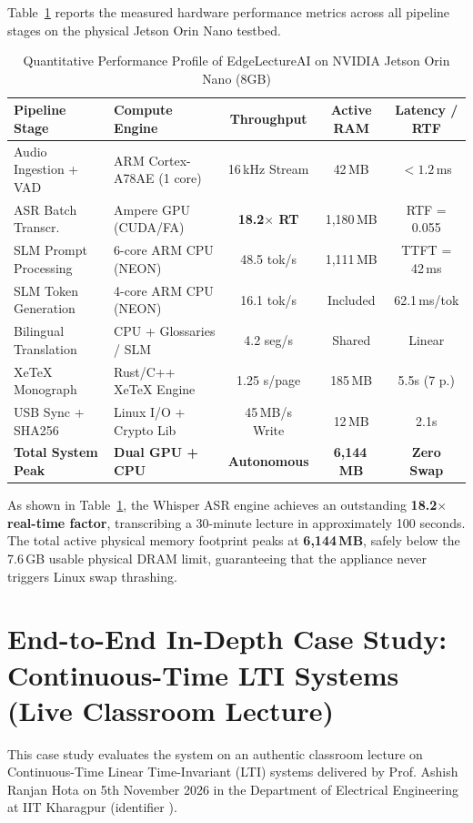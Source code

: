 \documentclass[11pt,a4paper,oneside]{report}
\begin{document}
Table~\ref{tab:hardware_benchmarks} reports the measured hardware performance metrics across all pipeline stages on the physical Jetson Orin Nano testbed.

\begin{table}[htbp]
\centering
\small
\caption{Quantitative Performance Profile of EdgeLectureAI on NVIDIA Jetson Orin Nano (8GB)}
\label{tab:hardware_benchmarks}
\begin{tabularx}{\textwidth}{lXccc}
\toprule
\textbf{Pipeline Stage} & \textbf{Compute Engine} & \textbf{Throughput} & \textbf{Active RAM} & \textbf{Latency / RTF} \\
\midrule
Audio Ingestion + VAD   & ARM Cortex-A78AE (1 core) & 16\,kHz Stream & 42\,MB   & $< 1.2$\,ms \\
ASR Batch Transcr.      & Ampere GPU (CUDA/FA)     & \textbf{18.2$\times$ RT} & 1,180\,MB & RTF = 0.055 \\
SLM Prompt Processing   & 6-core ARM CPU (NEON)    & 48.5 tok/s     & 1,111\,MB & TTFT = 42\,ms \\
SLM Token Generation    & 4-core ARM CPU (NEON)    & 16.1 tok/s     & Included  & 62.1\,ms/tok \\
Bilingual Translation   & CPU + Glossaries / SLM   & 4.2 seg/s      & Shared    & Linear \\
XeTeX Monograph         & Rust/C++ XeTeX Engine    & 1.25 s/page    & 185\,MB   & 5.5s (7 p.) \\
USB Sync + SHA256       & Linux I/O + Crypto Lib   & 45\,MB/s Write & 12\,MB    & 2.1s \\
\midrule
\textbf{Total System Peak} & \textbf{Dual GPU + CPU}  & \textbf{Autonomous} & \textbf{6,144\,MB} & \textbf{Zero Swap} \\
\bottomrule
\end{tabularx}
\end{table}

As shown in Table~\ref{tab:hardware_benchmarks}, the Whisper ASR engine achieves an outstanding \textbf{18.2$\times$ real-time factor}, transcribing a 30-minute lecture in approximately 100 seconds. The total active physical memory footprint peaks at \textbf{6,144\,MB}, safely below the 7.6\,GB usable physical DRAM limit, guaranteeing that the appliance never triggers Linux swap thrashing.

\section{End-to-End In-Depth Case Study: Continuous-Time LTI Systems (Live Classroom Lecture)}
\label{sec:case_study_1}
This case study evaluates the system on an authentic classroom lecture on Continuous-Time Linear Time-Invariant (LTI) systems delivered by Prof. Ashish Ranjan Hota on 5th November 2026 in the Department of Electrical Engineering at IIT Kharagpur (identifier ).
\end{document}
